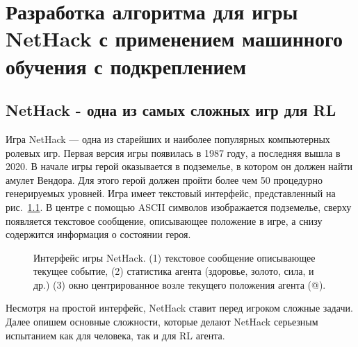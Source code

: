 \chapter{Разработка алгоритма для игры NetHack с применением машинного обучения с подкреплением}\label{ch:ch4}

\section{NetHack - одна из самых сложных игр для RL}

Игра NetHack --- одна из старейших и наиболее популярных компьютерных ролевых игр. Первая версия игры появилась в 1987 году, а последняя вышла в 2020. В начале игры герой оказывается в подземелье, в котором он должен найти амулет Вендора. Для этого герой должен пройти более чем 50 процедурно генерируемых уровней. Игра имеет текстовый интерфейс, представленный на рис.~\ref{fig:nethack_map}. В центре с помощью ASCII символов изображается подземелье, сверху появляется текстовое сообщение, описывающее положение в игре, а снизу содержится информация о состоянии героя. 

\begin{figure}[ht]
\caption{Интерфейс игры NetHack. (1) текстовое сообщение описывающее текущее событие, (2) статистика агента (здоровье, золото, сила, и др.) (3) окно центрированное возле текущего положения агента (@).}
    \label{fig:nethack_map}
\end{figure}

Несмотря на простой интерфейс, NetHack ставит перед игроком сложные задачи. Далее опишем основные сложности, которые делают NetHack серьезным испытанием как для человека, так и для RL агента.

